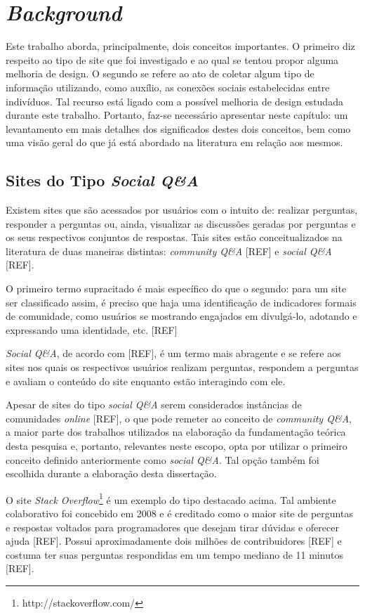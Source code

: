 \chapter{\textit{Background}}
Este trabalho aborda, principalmente, dois conceitos importantes. O primeiro diz respeito ao tipo de site que foi investigado e ao qual se tentou propor alguma melhoria de design. O segundo se refere ao ato de coletar algum tipo de informação utilizando, como auxílio, as conexões sociais estabelecidas entre indivíduos. Tal recurso está ligado com a possível melhoria de design estudada durante este trabalho. Portanto, faz-se necessário apresentar neste capítulo: um levantamento em mais detalhes dos significados destes dois conceitos, bem como uma visão geral do que já está abordado na literatura em relação aos mesmos.

\section{Sites do Tipo \textit{Social Q\&A}}
Existem sites que são acessados por usuários com o intuito de: realizar perguntas, responder a perguntas ou, ainda, visualizar as discussões geradas por perguntas e os seus respectivos conjuntos de respostas. Tais sites estão conceitualizados na literatura de duas maneiras distintas: \textit{community Q\&A} [REF] e \textit{social Q\&A} [REF].

O primeiro termo supracitado é mais específico do que o segundo: para um site ser classificado assim, é preciso que haja uma identificação de indicadores formais de comunidade, como usuários se mostrando engajados em divulgá-lo, adotando e expressando uma identidade, etc. [REF]

\textit{Social Q\&A}, de acordo com [REF], é um termo mais abragente e se refere aos sites nos quais os respectivos usuários realizam perguntas, respondem a perguntas e avaliam o conteúdo do site enquanto estão interagindo com ele.

Apesar de sites do tipo \textit{social Q\&A} serem considerados instâncias de comunidades \textit{online} [REF], o que pode remeter ao conceito de \textit{community Q\&A}, a maior parte dos trabalhos utilizados na elaboração da fundamentação teórica desta pesquisa e, portanto, relevantes neste escopo, opta por utilizar o primeiro conceito definido anteriormente como \textit{social Q\&A}. Tal opção também foi escolhida durante a elaboração desta dissertação.

O site \textit{Stack Overflow}\footnote{http://stackoverflow.com/} é um exemplo do tipo destacado acima. Tal ambiente colaborativo foi concebido em 2008 e é creditado como o maior site de perguntas e respostas voltados para programadores que desejam tirar dúvidas e oferecer ajuda [REF]. Possui aproximadamente dois milhões de contribuidores [REF] e costuma ter suas perguntas respondidas em um tempo mediano de 11 minutos [REF].

